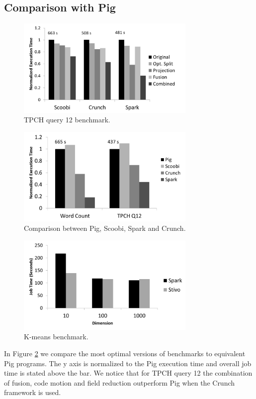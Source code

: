 \subsection{Comparison with Pig}
\label{subsec:pig}
\begin{figure}[t]
    \includegraphics[width=8.6cm]{figures/tpch}
   \caption{TPCH query 12 benchmark.}
  \label{fig:tpch}%
\end{figure}
\begin{figure}[t]
    \includegraphics[width=8.6cm]{figures/pig}
   \caption{Comparison between Pig, Scoobi, Spark and Crunch.}
   \label{fig:pig}%
\end{figure}

\begin{figure}[t]
    \includegraphics[width=8.6cm]{figures/k-means}
   \caption{K-means benchmark.}
   \label{fig:k-means}%
\end{figure}

In Figure \ref{fig:pig} we compare the most optimal versions of benchmarks to
equivalent Pig programs. The y axis is normalized to the Pig execution time and
overall job time is stated above the bar. We notice that for TPCH query 12 the
combination of fusion, code motion and field reduction outperform Pig when the
Crunch framework is used.

